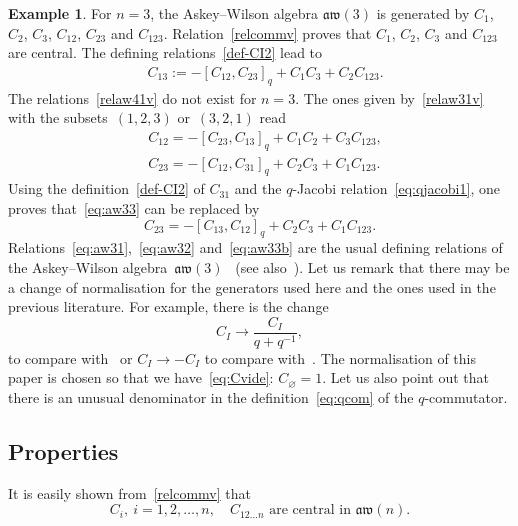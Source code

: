 \documentclass[pdftex]{sigma}
\numberwithin{equation}{section}
\theoremstyle{definition}
\newtheorem{exam}[theo]{Example}
\newcommand{\aw}{\mathfrak{aw}(n)}
\begin{document}
\begin{exam}\label{ex:aw3}
For $n=3$, the Askey--Wilson algebra $\mathfrak{aw}(3)$ is generated by $C_1$, $C_2$, $C_3$, $C_{12}$, $C_{23}$ and $C_{123}$.
Relation~\eqref{relcommv} proves that $C_1$, $C_2$, $C_3$ and $C_{123}$ are central. The defining relations~\eqref{def-CI2} lead to
\begin{align}\label{eq:aw31}
&C_{13} := -[C_{12},C_{23}]_q+ C_{1}C_{3}+C_{2}C_{123} .
\end{align}
The relations~\eqref{relaw41v} do not exist for $n=3$. The ones given by~\eqref{relaw31v} with the subsets~$(1,2,3)$ or~$(3,2,1)$ read
\begin{align}
&C_{12} = -[C_{23},C_{13}]_q+C_{1}C_{2}+C_{3}C_{123} ,\label{eq:aw32}
\\
&C_{23} = -[C_{12},C_{31}]_q+ C_{2}C_{3}+C_{1}C_{123} .\label{eq:aw33}
\end{align}
Using the definition~\eqref{def-CI2} of $C_{31}$ and the $q$-Jacobi relation~\eqref{eq:qjacobi1}, one proves that~\eqref{eq:aw33} can be replaced by
\begin{equation}
 C_{23} = -[C_{13},C_{12}]_q+ C_{2}C_{3}+C_{1}C_{123} .\label{eq:aw33b}
\end{equation}
Relations~\eqref{eq:aw31},~\eqref{eq:aw32} and~\eqref{eq:aw33b} are the usual defining relations of the Askey--Wilson algebra~$\mathfrak{aw}(3)$~\cite{Zh} (see also~\cite{avatar}).
Let us remark that there may be a change of normalisation for the generators used here and the ones used in the previous literature.
For example, there is the change
\[
C_I \to \frac{C_I}{q+q^{-1}},
\]
to compare with~\cite{avatar, DeC} or $C_I \to -C_I$ to compare with~\cite{PostWalt}.
The normalisation of this paper is chosen so that we have~\eqref{eq:Cvide}: $C_{\varnothing}=1$. Let us also point out that there is an unusual denominator in the definition~\eqref{eq:qcom} of the $q$-commutator.
\end{exam}


\subsection{Properties}%

It is easily shown from~\eqref{relcommv} that
\begin{equation*}
 C_i, \ i=1,2,\dots,n, \quad C_{12\dots n} \text{ are central in } \aw.
\end{equation*}
\end{document}
